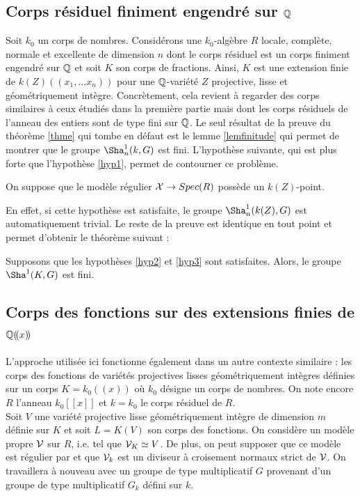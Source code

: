 \documentclass[11pt]{article}
\begin{document}
\subsection{Corps résiduel finiment engendré sur $\mathbb{Q}$}
Soit $k_0$ un corps de nombres. Considérons une $k_0$-algèbre $R$ locale, complète, normale et excellente de dimension $n$ dont le corps résiduel est un corps finiment engendré sur $\mathbb{Q}$ et soit $K$ son corps de fractions. Ainsi, $K$ est une extension finie de $k(Z)((x_1,...x_n))$ pour une $\mathbb{Q}$-variété $Z$ projective, lisse et géométriquement intègre. Concrètement, cela revient à regarder des corps similaires à ceux étudiés dans la première partie mais dont les corps résiduels de l'anneau des entiers sont de type fini sur $\mathbb{Q}$. Le seul résultat de la preuve du théorème \ref{thme} qui tombe en défaut est le lemme \ref{lemfinitude} qui permet de montrer que le groupe $\Sha^1_n(k,G)$ est fini. L'hypothèse suivante, qui est plus forte que l'hypothèse \ref{hyp1}, permet de contourner ce problème. 

\begin{hypoe}\label{hyp3}
On suppose que le modèle régulier $\mathcal{X} \rightarrow Spec(R)$ possède un $k(Z)$-point.
\end{hypoe}

En effet, si cette hypothèse est satisfaite, le groupe $\Sha^1_n(k(Z),G)$ est automatiquement trivial. Le reste de la preuve est identique en tout point et permet d'obtenir le théorème suivant :
 
\begin{thme}
    Supposons que les hypothèses \ref{hyp2} et \ref{hyp3} sont satisfaites. Alors, le groupe $\Sha^1(K,G)$ est fini.
\end{thme}


\subsection{Corps des fonctions sur des extensions finies de $\mathbb{Q}(\!(x)\!)$}
L'approche utilisée ici fonctionne également dans un autre contexte similaire : les corps des fonctions de variétés projectives lisses géométriquement intègres définies sur un corps $K = k_0(\!(x)\!)$ où $k_0$ désigne un corps de nombres. On note encore $R$ l'anneau $k_0[[x]]$ et $k = k_0$ le corps résiduel de $R$.\\

Soit $V$ une variété projective lisse géométriquement intègre de dimension $m$ définie sur $K$ et soit $L = K(V)$ son corps des fonctions. On considère un modèle propre $\mathcal{V}$ sur $R$, i.e. tel que $\mathcal{V}_{K} \simeq V$. De plus, on peut supposer que ce modèle est régulier par \cite{temkinDesingularizationQuasiexcellentSchemes2008} et que $\mathcal{V}_k$ est un diviseur à croisement normaux strict de $\mathcal{V}$. On travaillera à nouveau avec un groupe de type multiplicatif $G$ provenant d'un groupe de type multiplicatif $G_k$ défini sur $k$.
\end{document}
